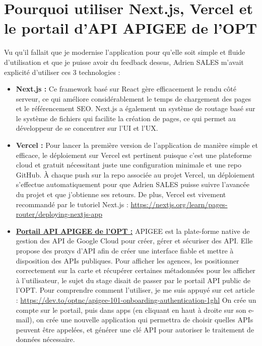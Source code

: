 \documentclass[12pt,a4paper]{report}
\begin{document}
\section{Pourquoi utiliser Next.js, Vercel et le portail d'API APIGEE de l'OPT}
Vu qu'il fallait que je modernise l'application pour qu'elle soit simple et fluide d'utilisation et que je puisse avoir du feedback dessus, Adrien SALES m'avait explicité d'utiliser ces 3 technologies :
\vspace{0.5cm}
\begin{itemize}
    \item \textbf{Next.js :} Ce framework basé sur React gère efficacement le rendu côté serveur, ce qui améliore considérablement le temps de chargement des pages et le référencement SEO. Next.js a également un système de routage basé sur le système de fichiers qui facilite la création de pages, ce qui permet au développeur de se concentrer sur l'UI et l'UX.
    \vspace{0.5cm}
    \item \textbf{Vercel :} Pour lancer la première version de l'application de manière simple et efficace, le \cite{deploy_vercel} déploiement sur Vercel est pertinent puisque c'est une plateforme cloud et gratuit nécessitant juste une configuration minimale et une repo GitHub. À chaque push sur la repo associée au projet Vercel, un déploiement s'effectue automatiquement pour que Adrien SALES puisse suivre l'avancée du projet et que j'obtienne ses retours. De plus, Vercel est vivement recommandé par le tutoriel Next.js : \href{https://nextjs.org/learn/pages-router/deploying-nextjs-app}{https://nextjs.org/learn/pages-router/deploying-nextjs-app}
    \vspace{0.5cm}
    \item \textbf{\href{https://apigee-optnc-prd-api.apigee.io}{Portail API APIGEE de l'OPT :}} \cite{comprendre_apigee} APIGEE est la plate-forme native de gestion des API de Google Cloud pour créer, gérer et sécuriser des API. Elle propose des proxys d'API afin de créer une interface fiable et mettre à disposition des APIs publiques. Pour afficher les agences, les positionner correctement sur la carte et récupérer certaines métadonnées pour les afficher à l'utilisateur, le sujet du stage disait de passer par le portail API public de l'OPT. Pour comprendre comment l'utiliser, je me suis appuyé sur cet \cite{apigee} article : \href{https://dev.to/optnc/apigee-101-onboarding-authentication-1ghl}{https://dev.to/optnc/apigee-101-onboarding-authentication-1ghl}
    \cite{apigee_yt} On crée un compte sur le portail, puis dans apps (en cliquant en haut à droite sur son e-mail), on crée une nouvelle application qui permettra de choisir quelles APIs peuvent être appelées, et générer une clé API pour autoriser le traitement de données nécessaire.
\end{itemize}
\end{document}

